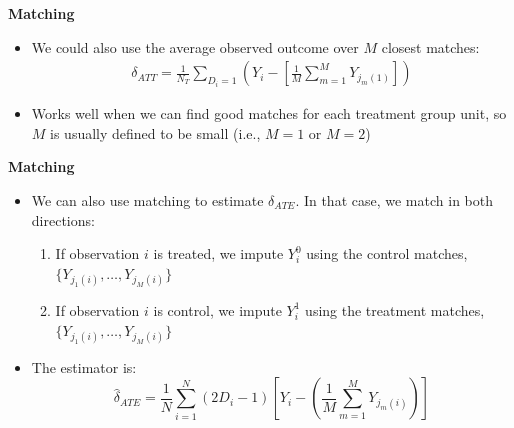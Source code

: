 \documentclass[notes=show]{beamer}
\begin{document}
\begin{frame}[plain]

	\begin{center}
	\textbf{Matching}
	\end{center}
	
	\begin{itemize}
	\item We could also use the average observed outcome over $M$ closest matches:
		\begin{eqnarray*}
		\delta_{ATT} = \frac{1}{N_T}\sum_{D_i=1}\left(Y_i-\left[\frac{1}{M}\sum_{m=1}^MY_{j_m(1)}\right]\right)
		\end{eqnarray*}
	\item Works well when we can find good matches for each treatment group unit, so $M$ is usually defined to be small (i.e., $M=1$ or $M=2$)
	\end{itemize}
\end{frame}

\begin{frame}[plain]
	\begin{center}
	\textbf{Matching}
	\end{center}
	
	\begin{itemize}
	\item We can also use matching to estimate $\delta_{ATE}$.  In that case, we match in both directions:
		\begin{enumerate}
		\item If observation $i$ is treated, we impute $Y^0_i$ using the control matches,     $\{Y_{j_1(i)}, \dots, Y_{j_M(i)}\}$
		\item If observation $i$ is control, we impute $Y^1_i$ using the treatment matches, $\{Y_{j_1(i)}, \dots, Y_{j_M(i)}\}$
		\end{enumerate}
	\item The estimator is:$$\widehat{\delta}_{ATE} = \frac{1}{N} \sum_{i=1}^N (2D_i -1) \left[ Y_i - \left( \frac{1}{M} \sum_{m=1}^M Y_{j_m(i)} \right) \right]$$	
	\end{itemize}
	
\end{frame}
\end{document}
